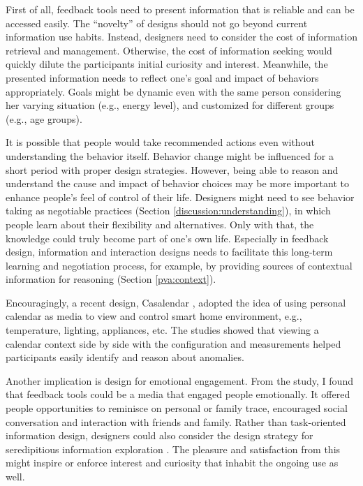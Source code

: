 \documentclass[12pt,oneside]{book}
\begin{document}
First of all, feedback tools need to present information that is reliable and can be accessed easily. The ``novelty'' of designs should not go beyond current information use habits. Instead, designers need to consider the cost of information retrieval and management. Otherwise, the cost of information seeking would quickly dilute the participants initial curiosity and interest. Meanwhile, the presented information needs to reflect one's goal and impact of behaviors appropriately. Goals might be dynamic even with the same person considering her varying situation (e.g., energy level), and customized for different groups (e.g., age groups).

It is possible that people would take recommended actions even without understanding the behavior itself. Behavior change might be influenced for a short period with proper design strategies. However, being able to reason and understand the cause and impact of behavior choices may be more important to enhance people's feel of control of their life. Designers might need to see behavior taking as negotiable practices (Section \ref{discussion:understanding}), in which people learn about their flexibility and alternatives. Only with that, the knowledge could truly become part of one's own life. Especially in feedback design, information and interaction designs needs to facilitate this long-term learning and negotiation process, for example, by providing sources of contextual information for reasoning (Section \ref{pva:context}).

Encouragingly, a recent design, Casalendar \cite{mennicken_integrating_2016}, adopted the idea of using personal calendar as media to view and control smart home environment, e.g., temperature, lighting, appliances, etc. The studies showed that viewing a calendar context side by side with the configuration and measurements helped participants easily identify and reason about anomalies.

Another implication is design for emotional engagement. From the study, I found that feedback tools could be a media that engaged people emotionally. It offered people opportunities to reminisce on personal or family trace, encouraged social conversation and interaction with friends and family. Rather than task-oriented information design, designers could also consider the design strategy for seredipitious information exploration \cite{thudt_visual_2015}.  The pleasure and satisfaction from this might inspire or enforce interest and curiosity that inhabit the ongoing use as well.
\end{document}

